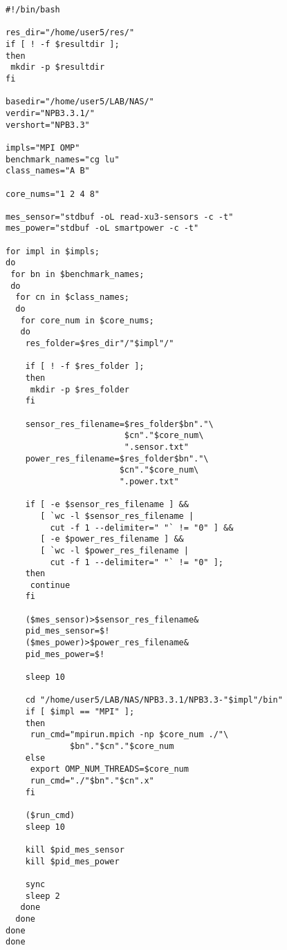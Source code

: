 \begin{lstlisting}[label=lst:meassure.sh, caption={meassure.sh}]
#!/bin/bash

res_dir="/home/user5/res/"
if [ ! -f $resultdir ];
then
 mkdir -p $resultdir
fi

basedir="/home/user5/LAB/NAS/"
verdir="NPB3.3.1/"
vershort="NPB3.3"

impls="MPI OMP"
benchmark_names="cg lu"
class_names="A B"

core_nums="1 2 4 8"

mes_sensor="stdbuf -oL read-xu3-sensors -c -t"
mes_power="stdbuf -oL smartpower -c -t"

for impl in $impls;
do
 for bn in $benchmark_names;
 do
  for cn in $class_names;
  do
   for core_num in $core_nums;
   do
    res_folder=$res_dir"/"$impl"/"
    
    if [ ! -f $res_folder ];
    then
     mkdir -p $res_folder
    fi
    
    sensor_res_filename=$res_folder$bn"."\
                        $cn"."$core_num\
                        ".sensor.txt"
    power_res_filename=$res_folder$bn"."\
                       $cn"."$core_num\
                       ".power.txt"
    
    if [ -e $sensor_res_filename ] && 
       [ `wc -l $sensor_res_filename | 
         cut -f 1 --delimiter=" "` != "0" ] && 
       [ -e $power_res_filename ] &&
       [ `wc -l $power_res_filename | 
         cut -f 1 --delimiter=" "` != "0" ];
    then
     continue
    fi
    
    ($mes_sensor)>$sensor_res_filename& 
    pid_mes_sensor=$!
    ($mes_power)>$power_res_filename&
    pid_mes_power=$!

    sleep 10 
    
    cd "/home/user5/LAB/NAS/NPB3.3.1/NPB3.3-"$impl"/bin"
    if [ $impl == "MPI" ];
    then
     run_cmd="mpirun.mpich -np $core_num ./"\
             $bn"."$cn"."$core_num
    else
     export OMP_NUM_THREADS=$core_num
     run_cmd="./"$bn"."$cn".x"
    fi
    
    ($run_cmd)
    sleep 10
    
    kill $pid_mes_sensor
    kill $pid_mes_power
    
    sync
    sleep 2
   done
  done
done
done
\end{lstlisting}